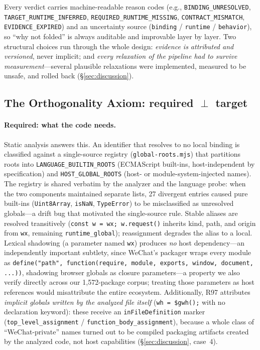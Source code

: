 \documentclass[sigconf,nonacm]{acmart}
\begin{document}
Every verdict carries machine-readable reason codes (e.g., \texttt{BINDING\_UNRESOLVED}, \texttt{TARGET\_RUNTIME\_INFERRED}, \texttt{REQUIRED\_RUNTIME\_MISSING}, \texttt{CONTRACT\_MISMATCH}, \texttt{EVIDENCE\_EXPIRED}) and an uncertainty source (\texttt{binding} / \texttt{runtime} / \texttt{behavior}), so ``why not folded'' is always auditable and improvable layer by layer. Two structural choices run through the whole design: \emph{evidence is attributed and versioned}, never implicit; and \emph{every relaxation of the pipeline had to survive measurement}---several plausible relaxations were implemented, measured to be unsafe, and rolled back (\S\ref{sec:discussion}).

\subsection{The Orthogonality Axiom: required $\perp$ target}\label{sec:axiom}

\paragraph{Required: what the code needs.} Static analysis answers this. An identifier that resolves to no local binding is classified against a single-source registry (\texttt{global-roots.mjs}) that partitions roots into \texttt{LANGUAGE\_BUILTIN\_ROOTS} (ECMAScript built-ins, host-independent by specification) and \texttt{HOST\_GLOBAL\_ROOTS} (host- or module-system-injected names). The registry is shared verbatim by the analyzer and the language probe: when the two components maintained separate lists, 27 divergent entries caused pure built-ins (\texttt{Uint8Array}, \texttt{isNaN}, \texttt{TypeError}) to be misclassified as unresolved globals---a drift bug that motivated the single-source rule. Stable aliases are resolved transitively (\texttt{const w = wx; w.request()} inherits kind, path, and origin from \texttt{wx}, remaining \texttt{runtime\_global}); reassignment degrades the alias to a local. Lexical shadowing (a parameter named \texttt{wx}) produces \emph{no} host dependency---an independently important subtlety, since WeChat's packager wraps every module as \texttt{define("path", function(require, module, exports, window, document, ...))}, shadowing browser globals as closure parameters---a property we also verify directly across our 1{,}572-package corpus; treating those parameters as host references would misattribute the entire ecosystem. Additionally, R97 attributes \emph{implicit globals written by the analyzed file itself} (\texttt{wh = \$gwh();} with no declaration keyword): these receive an \texttt{inFileDefinition} marker (\texttt{top\_level\_assignment} / \texttt{function\_body\_assignment}), because a whole class of ``WeChat-private'' names turned out to be compiled packaging artifacts created by the analyzed code, not host capabilities (\S\ref{sec:discussion}, case~4).
\end{document}
